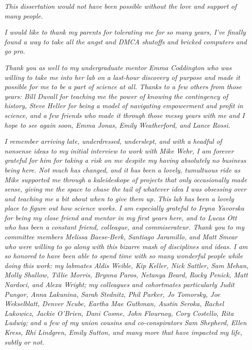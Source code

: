 \begin{acknowledgements}
\textit{This dissertation would not have been possible without the love and support of many people.}

\textit{I would like to thank my parents for tolerating me for so many years, I've finally found a way to take all the angst and DMCA shutoffs and bricked computers and go pro.}

\textit{Thank you as well to my undergraduate mentor Emma Coddington who was willing to take me into her lab on a last-hour discovery of purpose and made it possible for me to be a part of science at all. Thanks to a few others from those years: Bill Duvall for teaching me the power of knowing the contingency of history, Steve Heller for being a model of navigating empowerment and profit in science, and a few friends who made it through those messy years with me and I hope to see again soon, Emma Jonas, Emily Weatherford, and Lance Rossi.}

\textit{I remember arriving late, underdressed, underslept, and with a headful of nonsense ideas to my initial interview to work with Mike Wehr, I am forever grateful for him for taking a risk on me despite my having absolutely no business being here. Not much has changed, and it has been a lovely, tumultuous ride as Mike supported me through a kaleideskope of projects that only occasionally made sense, giving me the space to chase the tail of whatever idea I was obsessing over and teaching me a bit about when to give them up. This lab has been a lovely place to figure out how science works. I am especially grateful to Iryna Yavorska for being my close friend and mentor in my first years here, and to Lucas Ott who has been a constant friend, colleague, and commiserateur. Thank you to my committee members Melissa Baese-Berk, Santiago Jaramillo, and Matt Smear who were willing to go along with this bizarre mash of disciplines and ideas. I am so honored to have been able to spend time with so many wonderful people while doing this work: my labmates Aldis Weible, Kip Keller, Nick Sattler, Sam Mehan, Molly Shallow, Tillie Morris, Brynna Paros, Netanya Beard, Rocky Penick, Matt Nardoci, and Alexa Wright; my colleagues and cohortmates particularly Judit Pungor, Anna Lakunina, Sarah Stednitz, Phil Parker, Jo Tomorsky, Joe Wekselblatt, Denver Ncube, Eartha Mae Guthman, Austin Seroka, Rachel Lukowicz, Jackie O'Brien, Dani Cosme, John Flournoy, Cory Costello, Rita Ludwig; and a few of my union cousins and co-conspirators Sam Shepherd, Ellen Kress, Rhi Lindgren, Emily Sutton, and many more that have impacted my life, subtly or not.}


\end{acknowledgements}
